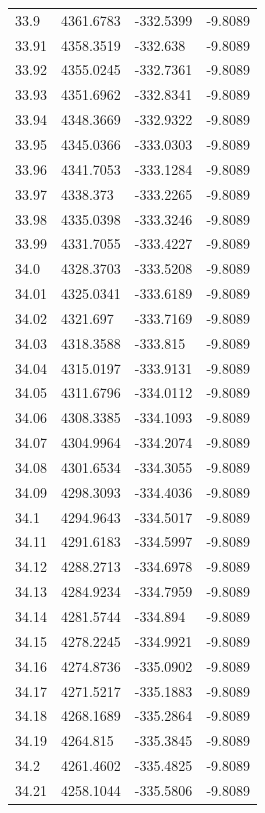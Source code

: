\begin{table}[H]
\begin{tabular}{llll}
33.9 & 4361.6783 & -332.5399 & -9.8089 \\
33.91 & 4358.3519 & -332.638 & -9.8089 \\
33.92 & 4355.0245 & -332.7361 & -9.8089 \\
33.93 & 4351.6962 & -332.8341 & -9.8089 \\
33.94 & 4348.3669 & -332.9322 & -9.8089 \\
33.95 & 4345.0366 & -333.0303 & -9.8089 \\
33.96 & 4341.7053 & -333.1284 & -9.8089 \\
33.97 & 4338.373 & -333.2265 & -9.8089 \\
33.98 & 4335.0398 & -333.3246 & -9.8089 \\
33.99 & 4331.7055 & -333.4227 & -9.8089 \\
34.0 & 4328.3703 & -333.5208 & -9.8089 \\
34.01 & 4325.0341 & -333.6189 & -9.8089 \\
34.02 & 4321.697 & -333.7169 & -9.8089 \\
34.03 & 4318.3588 & -333.815 & -9.8089 \\
34.04 & 4315.0197 & -333.9131 & -9.8089 \\
34.05 & 4311.6796 & -334.0112 & -9.8089 \\
34.06 & 4308.3385 & -334.1093 & -9.8089 \\
34.07 & 4304.9964 & -334.2074 & -9.8089 \\
34.08 & 4301.6534 & -334.3055 & -9.8089 \\
34.09 & 4298.3093 & -334.4036 & -9.8089 \\
34.1 & 4294.9643 & -334.5017 & -9.8089 \\
34.11 & 4291.6183 & -334.5997 & -9.8089 \\
34.12 & 4288.2713 & -334.6978 & -9.8089 \\
34.13 & 4284.9234 & -334.7959 & -9.8089 \\
34.14 & 4281.5744 & -334.894 & -9.8089 \\
34.15 & 4278.2245 & -334.9921 & -9.8089 \\
34.16 & 4274.8736 & -335.0902 & -9.8089 \\
34.17 & 4271.5217 & -335.1883 & -9.8089 \\
34.18 & 4268.1689 & -335.2864 & -9.8089 \\
34.19 & 4264.815 & -335.3845 & -9.8089 \\
34.2 & 4261.4602 & -335.4825 & -9.8089 \\
34.21 & 4258.1044 & -335.5806 & -9.8089 \\

\end{tabular}
\end{table}
